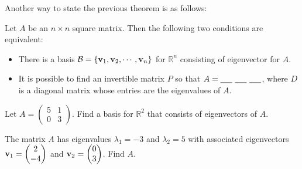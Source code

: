 Another way to state the previous theorem is as follows:
\begin{thm}
    Let $A$ be an $n \times n$ square matrix.  Then the following two conditions are
    equivalent:
    \begin{itemize}
        \item There is a basis $\mathcal{B} = \{ {\bf v}_1, {\bf v}_2, \cdots, {\bf v}_n\}$ for
            $\mathbb{R}^n$ consisting of eigenvector for $A$.
        \item It is possible to find an invertible matrix $P$ so that $A = \underline{\hspace{0.2in}} ~ \underline{\hspace{0.2in}}
        ~\underline{\hspace{0.2in}}$,
            where $D$ is a diagonal matrix whose entries are the eigenvalues of $A$.
    \end{itemize}
\end{thm}

\begin{problem}
    Let $A = \begin{pmatrix} 5 & 1 \\ 0 & 3 \end{pmatrix}$.  Find a basis for
        $\mathbb{R}^2$ that consists of eigenvectors of $A$.
\end{problem}


\begin{problem}
    The matrix $A$ has eigenvalues $\lambda_1 = -3$ and $\lambda_2 = 5$ with associated
    eigenvectors ${\bf v}_1 = \begin{pmatrix} 2 \\ -4 \end{pmatrix}$ and ${\bf v}_2 =
        \begin{pmatrix} 0 \\ 3 \end{pmatrix}$.  Find $A$.
\end{problem}
\solution{
    \[ A = PDP^{-1} = \begin{pmatrix} 2 & 0 \\ -4 & 3 \end{pmatrix} \begin{pmatrix} -3 & 0
            \\ 0 & 5 \end{pmatrix} \begin{pmatrix} 2 & 0 \\ -4 & 3 \end{pmatrix}^{-1} \]
}


